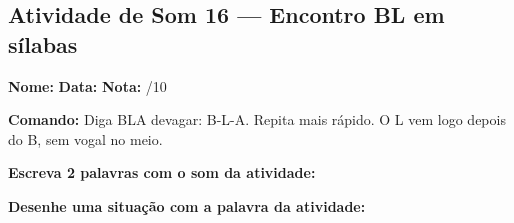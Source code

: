 \subsection{Atividade de Som 16 --- Encontro BL em sílabas}
\begin{exercicio}



\noindent\textbf{Nome:} \underline{\hspace{3.2cm}} \quad \textbf{Data:} \underline{\hspace{1.6cm}} \quad \textbf{Nota:} \underline{\hspace{0.9cm}}/10


\noindent\textbf{Comando:} Diga BLA devagar: B-L-A. Repita mais rápido. O L vem logo depois do B, sem vogal no meio.


\begin{center}
\end{center}

\noindent\textbf{Escreva 2 palavras com o som da atividade:}

\begin{center}
  \underline{\hspace{3cm}} \quad \underline{\hspace{3cm}}
\end{center}

\noindent\textbf{Desenhe uma situação com a palavra da atividade:}

\begin{center}
\end{center}

\end{exercicio}



